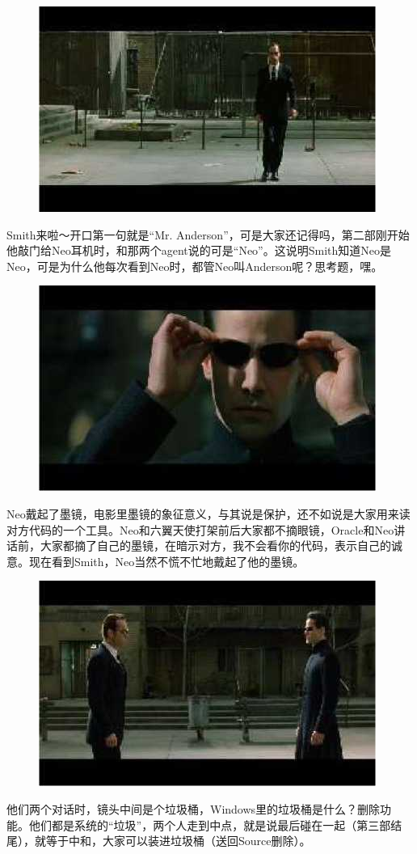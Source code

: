 \documentclass[UTF8]{ctexart}
\begin{document}
\begin{figure}[htb]
\centering
\includegraphics[width=0.5\linewidth]{fig/read_reloaded-69}
\end{figure}

Smith来啦～开口第一句就是“Mr. Anderson”，可是大家还记得吗，第二部刚开始他敲门给Neo耳机时，和那两个agent说的可是“Neo”。这说明Smith知道Neo是Neo，可是为什么他每次看到Neo时，都管Neo叫Anderson呢？思考题，嘿。

\begin{figure}[htb]
\centering
\includegraphics[width=0.5\linewidth]{fig/read_reloaded-70}
\end{figure}

Neo戴起了墨镜，电影里墨镜的象征意义，与其说是保护，还不如说是大家用来读对方代码的一个工具。Neo和六翼天使打架前后大家都不摘眼镜，Oracle和Neo讲话前，大家都摘了自己的墨镜，在暗示对方，我不会看你的代码，表示自己的诚意。现在看到Smith，Neo当然不慌不忙地戴起了他的墨镜。

\begin{figure}[htb]
\centering
\includegraphics[width=0.5\linewidth]{fig/read_reloaded-71}
\end{figure}

他们两个对话时，镜头中间是个垃圾桶，Windows里的垃圾桶是什么？删除功能。他们都是系统的“垃圾”，两个人走到中点，就是说最后碰在一起（第三部结尾），就等于中和，大家可以装进垃圾桶（送回Source删除）。
\end{document}
